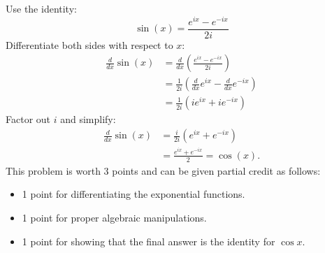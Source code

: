 \documentclass[12pt]{article}
\newenvironment{problem}[2][Problem]{\begin{trivlist}
\item[\hskip \labelsep {\bfseries #1}\hskip \labelsep {\bfseries #2.}]}
{\end{trivlist}}
\begin{document}
\begin{problem}{3 Solution}
Use the identity:
\[
  \sin(x) = \frac{e^{ix} - e^{-ix}}{2i}
\]
Differentiate both sides with respect to $x$:
\[
\begin{aligned}
  \frac{d}{dx}\sin(x) &= \frac{d}{dx}\left(\frac{e^{ix} - e^{-ix}}{2i}\right)\\
  &= \frac{1}{2i} \left( \frac{d}{dx} e^{ix} - \frac{d}{dx} e^{-ix} \right)\\
  &= \frac{1}{2i} \left( i e^{ix} + i e^{-ix} \right)
\end{aligned}
\]
Factor out $i$ and simplify:
\[
\begin{aligned}
  \frac{d}{dx}\sin(x) &= \frac{i}{2i} (e^{ix} + e^{-ix})\\
  &= \frac{e^{ix} + e^{-ix}}{2} = \cos(x).
\end{aligned}
\]
This problem is worth 3 points and can be given partial credit as follows:
\begin{itemize}
  \item 1 point for differentiating the exponential functions.
  \item 1 point for proper algebraic manipulations.
  \item 1 point for showing that the final answer is the identity for $\cos x$.
\end{itemize}
\end{problem}

\end{document}
